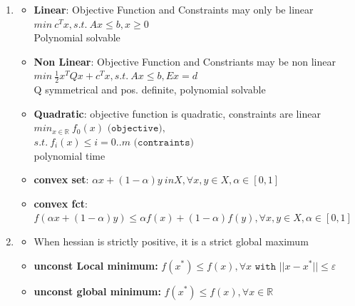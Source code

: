 \documentclass{report}
\begin{document}
\begin{enumerate}
\item 
\begin{itemize}
\item \textbf{Linear}: Objective Function and Constraints may only be linear
$min\ c^Tx, s.t.\ Ax \leq b, x \geq 0$\\
Polynomial solvable
\item \textbf{Non Linear}: Objective Function and Constriants may  be non linear
$min\ \frac{1}{2} x^TQx + c^Tx, s.t.\ Ax \leq b, Ex = d$\\
Q symmetrical and pos. definite, polynomial solvable
\item \textbf{Quadratic}: objective function is quadratic, constraints are linear	
$min_{x \in \mathbb{R}}\ f_0(x) \texttt{ (objective)},$\\
$s.t.\ f_i(x) \leq i=0..m \texttt{ (contraints)}$\\
polynomial time
\item \textbf{convex set}: 
$\alpha x + (1 - \alpha)y \ in X, \forall x, y \in X, \alpha \in [0, 1]$
\item \textbf{convex fct}:
$f(\alpha x + (1 - \alpha)y) \leq \alpha f(x) + (1 - \alpha)f(y) , \forall x, y \in X, \alpha \in [0, 1]$ 
\end{itemize}
\item 
\begin{itemize}
	\item When hessian is strictly positive, it is a strict global maximum
	\item \textbf{unconst Local minimum:} $f(x^*) \leq f(x), \forall x \texttt{ with } || x - x^* || \leq \varepsilon$
	\item \textbf{unconst global minimum:} $f(x^*) \leq f(x), \forall x \in \mathbb{R}$
\end{itemize}


\end{enumerate}
\end{document}
